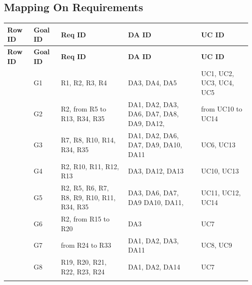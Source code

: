 \subsection{Mapping On Requirements}
\label{subsec:mapping_on_requirements}

\setcounter{row}{1}
\newcommand{\crow} {\therow\stepcounter{row}}

\begin{longtable}{
    |>{\centering\arraybackslash}p{2cm}
    |>{\centering\arraybackslash}p{2.5cm}
    |>{\centering\arraybackslash}p{5cm}
    |>{\centering\arraybackslash}p{3.5cm}
    |>{\centering\arraybackslash}p{2.5cm}|
}
    \hline
    \textbf{Row ID} & \textbf{Goal ID} & \textbf{Req ID} & \textbf{DA ID} & \textbf{UC ID} \\ \hline
    \endfirsthead
    \hline
    \textbf{Row ID} & \textbf{Goal ID} & \textbf{Req ID} & \textbf{DA ID} & \textbf{UC ID} \\ \hline
    \endhead
    \hline
    \endfoot
    \hline
    \endlastfoot

    \crow & G1 & R1, R2, R3, R4 & DA3, DA4, DA5 & UC1, UC2, UC3, UC4, UC5 \\ \hline
    \crow & G2 & R2, from R5 to R13, R34, R35 & DA1, DA2, DA3, DA6, DA7, DA8, DA9, DA12, & from UC10 to UC14 \\ \hline
    \crow & G3 & R7, R8, R10, R14, R34, R35 & DA1, DA2, DA6, DA7, DA9, DA10, DA11 & UC6, UC13 \\ \hline
    \crow & G4 & R2, R10, R11, R12, R13 & DA3, DA12, DA13 & UC10, UC13 \\ \hline
    \crow & G5 & R2, R5, R6, R7, R8, R9, R10, R11, R34, R35 & DA3, DA6, DA7, DA9 DA10, DA11, & UC11, UC12, UC14 \\ \hline
    \crow & G6 & R2, from R15 to R20 & DA3 &  UC7 \\ \hline
    \crow & G7 & from R24 to R33 & DA1, DA2, DA3, DA11 & UC8, UC9 \\ \hline
    \crow & G8 & R19, R20, R21, R22, R23, R24 & DA1, DA2, DA14 & UC7\\ %
    

\label{tab:traceability}
\end{longtable}




